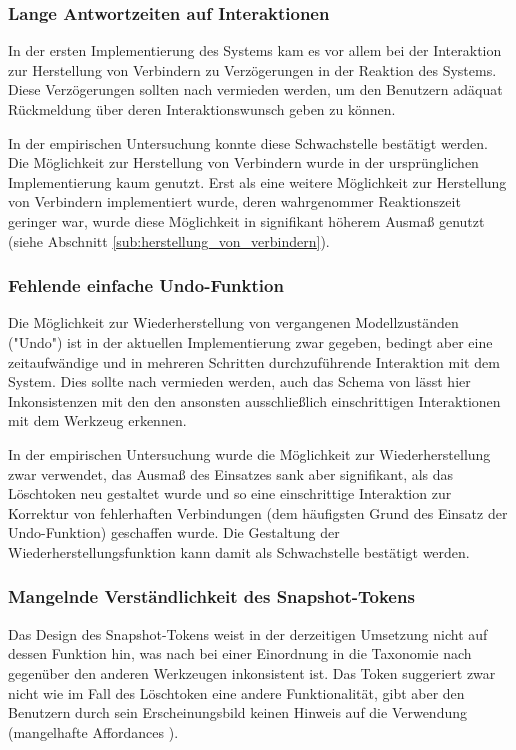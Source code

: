 \subsubsection{Lange Antwortzeiten auf Interaktionen}

In der ersten Implementierung des Systems kam es vor allem bei der Interaktion zur Herstellung von Verbindern zu Verzögerungen in der Reaktion des Systems. Diese Verzögerungen sollten nach \citep{Bellotti02} vermieden werden, um den Benutzern adäquat Rückmeldung über deren Interaktionswunsch geben zu können.

In der empirischen Untersuchung konnte diese Schwachstelle bestätigt werden. Die Möglichkeit zur Herstellung von Verbindern wurde in der ursprünglichen Implementierung kaum genutzt. Erst als eine weitere Möglichkeit zur Herstellung von Verbindern implementiert wurde, deren wahrgenommer Reaktionszeit geringer war, wurde diese Möglichkeit in signifikant höherem Ausmaß genutzt (siehe Abschnitt \ref{sub:herstellung_von_verbindern}).

\subsubsection{Fehlende einfache Undo-Funktion}

Die Möglichkeit zur Wiederherstellung von vergangenen Modellzuständen ("Undo") ist in der aktuellen Implementierung zwar gegeben, bedingt aber eine zeitaufwändige und in mehreren Schritten durchzuführende Interaktion mit dem System. Dies sollte nach \citep{Bellotti02} vermieden werden, auch das Schema von \citep{Shaer04} lässt hier Inkonsistenzen mit den den ansonsten ausschließlich einschrittigen Interaktionen mit dem Werkzeug erkennen.

In der empirischen Untersuchung wurde die Möglichkeit zur Wiederherstellung zwar verwendet, das Ausmaß des Einsatzes sank aber signifikant, als das Löschtoken neu gestaltet wurde und so eine einschrittige Interaktion zur Korrektur von fehlerhaften Verbindungen (dem häufigsten Grund des Einsatz der Undo-Funktion) geschaffen wurde. Die Gestaltung der Wiederherstellungsfunktion kann damit als Schwachstelle bestätigt werden.

\subsubsection{Mangelnde Verständlichkeit des Snapshot-Tokens}

Das Design des Snapshot-Tokens weist in der derzeitigen Umsetzung nicht auf dessen Funktion hin, was nach bei einer Einordnung in die Taxonomie nach \citep{Fishkin04} gegenüber den anderen Werkzeugen inkonsistent ist. Das Token suggeriert zwar nicht wie im Fall des Löschtoken eine andere Funktionalität, gibt aber den Benutzern durch sein Erscheinungsbild keinen Hinweis auf die Verwendung (mangelhafte Affordances \citet{Norman90}).

